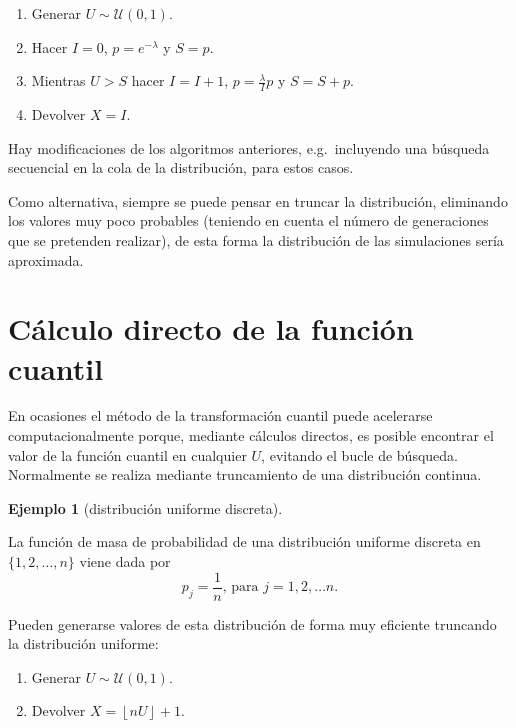 \documentclass[
]{book}
\theoremstyle{break}
\theoremstyle{definition}
\theoremstyle{definition}
\newtheorem{example}{Ejemplo}[chapter]
\theoremstyle{definition}
\theoremstyle{definition}
\theoremstyle{remark}
\begin{document}
\begin{enumerate}
\def\labelenumi{\arabic{enumi}.}
\item
  Generar \(U\sim \mathcal{U}\left( 0,1\right)\).
\item
  Hacer \(I=0\), \(p=e^{-\lambda}\) y \(S=p\).
\item
  Mientras \(U>S\) hacer \(I=I+1\), \(p=\frac{\lambda}{I}p\) y \(S=S+p\).
\item
  Devolver \(X=I\).
\end{enumerate}

Hay modificaciones de los algoritmos anteriores, e.g.~incluyendo
una búsqueda secuencial en la cola de la distribución, para
estos casos.

Como alternativa, siempre se puede pensar en truncar la distribución,
eliminando los valores muy poco probables (teniendo en
cuenta el número de generaciones que se pretenden realizar),
de esta forma la distribución de las simulaciones sería aproximada.

\hypertarget{cuxe1lculo-directo-de-la-funciuxf3n-cuantil}{%
\section{Cálculo directo de la función cuantil}\label{cuxe1lculo-directo-de-la-funciuxf3n-cuantil}}

En ocasiones el método de la transformación cuantil puede acelerarse
computacionalmente porque, mediante cálculos directos, es posible
encontrar el valor de la función cuantil en cualquier \(U\),
evitando el bucle de búsqueda.
Normalmente se realiza mediante truncamiento de una distribución continua.

\begin{example}[distribución uniforme discreta]
\protect\hypertarget{exm:unnamed-chunk-23}{}{\label{exm:unnamed-chunk-23} {} }
\end{example}

La función de masa de probabilidad de una distribución uniforme discreta
en \(\{1,2,\ldots,n\}\) viene dada por
\[p_{j}=\frac{1}{n}\text{, para }j=1,2,\ldots n.\]

Pueden generarse valores de esta distribución de forma muy eficiente
truncando la distribución uniforme:

\begin{enumerate}
\def\labelenumi{\arabic{enumi}.}
\item
  Generar \(U\sim \mathcal{U}\left( 0,1\right)\).
\item
  Devolver \(X=\left\lfloor nU\right\rfloor + 1\).
\end{enumerate}
\end{document}
